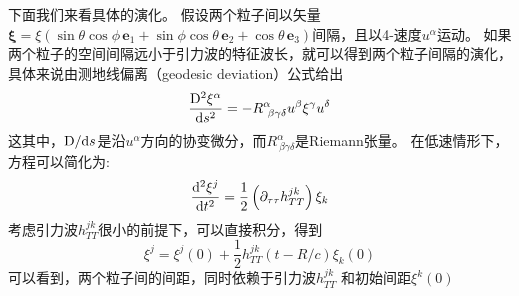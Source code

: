 下面我们来看具体的演化。
假设两个粒子间以矢量 $\boldsymbol{\xi} = \xi(\sin\theta \cos \phi \,\mathbf{e}_1+\sin\phi\cos \theta \, \mathbf{e}_2+\cos \theta  \,\mathbf{e}_3)$间隔，且以4-速度$u^\alpha$运动。
如果两个粒子的空间间隔远小于引力波的特征波长，就可以得到两个粒子间隔的演化，具体来说由测地线偏离（geodesic deviation）公式给出
\begin{equation}\label{eq:GW2particle} 
  \frac{{\rm D}^2 \xi^\alpha}{{\rm d}s^2} = -R ^{\alpha} _{~\beta\gamma\delta} u^{\beta} \xi^\gamma u^\delta
\end{equation}
这其中，${\rm D}/{\rm d}s$是沿$u^\alpha$方向的协变微分，而$R ^{\alpha} _{~\beta\gamma\delta}$是Riemann张量。
在低速情形下，方程可以简化为:
\begin{equation}\label{eq:GW2particleSimp} 
  \frac{{\rm d}^2 \xi^j}{{\rm d}t^2} = \frac{1}{2}\left(\partial_{\tau\tau} h^{jk}_{TT}\right) \xi_k
\end{equation}
考虑引力波$h^{jk}_{TT}$很小的前提下，可以直接积分，得到
\begin{equation}\label{eq:GW2particleSimp} 
  \xi^j = \xi^j (0)+\frac{1}{2}h^{jk}_{TT}(t-R/c)\xi_k(0)
\end{equation}
可以看到，两个粒子间的间距，同时依赖于引力波$h^{jk}_{TT}$ 和初始间距$\xi^k(0)$

